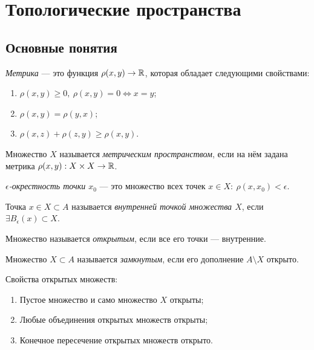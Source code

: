 \section{Топологические пространства}
\subsection{Основные понятия}
\begin{definition}
    \textit{Метрика} — это функция $\rho(x,y) \to \mathbb{R}$, которая обладает следующими свойствами:
    \begin{enumerate}
        \item $\rho(x,y) \geq 0, \ \rho(x,y) = 0 \Longleftrightarrow x = y$;
        \item $\rho(x,y) = \rho(y,x)$;
        \item $\rho(x,z) + \rho(z,y) \geq \rho(x,y)$.
    \end{enumerate}
\end{definition}

\begin{definition}
    Множество $X$ называется \textit{метрическим пространством}, если на нём задана метрика $\rho(x,y): X \times X \to \mathbb{R}$.
\end{definition}

\begin{definition}
    \textit{$\epsilon$-окрестность точки $x_0$} — это множество всех точек $x \in X: \ \rho(x, x_0) < \epsilon$.
\end{definition}

\begin{definition}
    Точка $x \in X \subset A$ называется \textit{внутренней точкой множества $X$}, если $\exists B_{\epsilon} (x) \subset X$.
\end{definition}

\begin{definition}
    Множество называется \textit{открытым}, если все его точки — внутренние.
\end{definition}

\begin{definition}
    Множество $X \subset A$ называется \textit{замкнутым}, если его дополнение $A \setminus X$ открыто.
\end{definition}

Свойства открытых множеств:
\begin{enumerate}
    \item Пустое множество и само множество $X$ открыты;
    \item Любые объединения открытых множеств открыты;
    \item Конечное пересечение открытых множеств открыто.
\end{enumerate}

